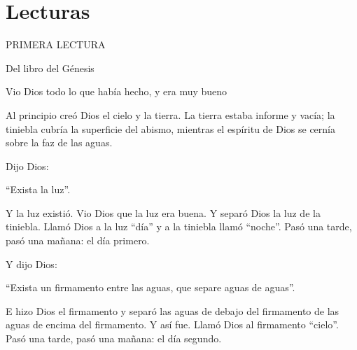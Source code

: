 			\section{Lecturas}
			
			\begin{readtitle}PRIMERA LECTURA\end{readtitle}
			
			\begin{readbook}Del libro del Génesis \end{readbook}
			
			\begin{readtheme}Vio Dios todo lo que había hecho, y era muy bueno\end{readtheme}
			
			\begin{readbody}Al principio creó Dios el cielo y la tierra. La tierra estaba informe y vacía; la tiniebla cubría la superficie del abismo, mientras el espíritu de Dios se cernía sobre la faz de las aguas. \end{readbody}
			
			\begin{readbody}Dijo Dios: \end{readbody}
			
			\begin{readtalk}“Exista la luz”. \end{readtalk}
			
			\begin{readbody}Y la luz existió. Vio Dios que la luz era buena. Y separó Dios la luz de la tiniebla. Llamó Dios a la luz “día” y a la tiniebla llamó “noche”. Pasó una tarde, pasó una mañana: el día primero. \end{readbody}
			
			\begin{readbody}Y dijo Dios: \end{readbody}
			
			\begin{readtalk}“Exista un firmamento entre las aguas, que separe aguas de aguas”. \end{readtalk}
			
			\begin{readbody}E hizo Dios el firmamento y separó las aguas de debajo del firmamento de las aguas de encima del firmamento. Y así fue. Llamó Dios al firmamento “cielo”. Pasó una tarde, pasó una mañana: el día segundo. \end{readbody}
			
